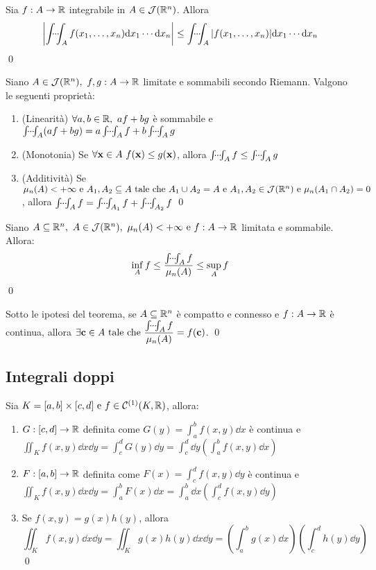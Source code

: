 \begin{theorem}
    Sia $f: A \to \mathbb{R}$ integrabile in $A \in \mathcal{J}(\mathbb{R}^n)$. Allora
    $$
        \abs{\idotsint_A f(x_1,\dots,x_n)\dd x_1\cdots \dd x_n} \leq \idotsint_A\abs{f(x_1,\dots,x_n)}\dd x_1\cdots \dd x_n
    $$
    \qed
\end{theorem}

\begin{theorem}
    Siano $A \in \mathcal{J}(\mathbb{R}^n), \ f,g: A \to \mathbb{R}$ limitate e sommabili secondo Riemann. Valgono le seguenti proprietà:
    \begin{enumerate}
        \item (Linearità) $\forall a,b \in \mathbb{R}, \ af + bg$ è sommabile e $\idotsint_A(af+bg)=a\idotsint_A f+b\idotsint_A g$
        \item (Monotonia) Se $\forall \vb{x} \in A \ f(\vb{x}) \leq g(\vb{x})$, allora $\idotsint_A f \leq \idotsint_A g$
        \item (Additività) Se $\mu_n(A) < + \infty \text{ e } A_1,A_2 \subseteq A \text{ tale che } A_1 \cup A_2 = A \text{ e } A_1,A_2 \in \mathcal{J}(\mathbb{R}^n) \text{ e } \mu_n(A_1 \cap A_2)=0$, allora $\idotsint_A f= \idotsint_{A_1} f+ \idotsint_{A_2} f$
        \qed
    \end{enumerate}
\end{theorem}

\begin{theorem}
    Siano $A \subseteq \mathbb{R}^n, \ A \in \mathcal{J}(\mathbb{R}^n), \ \mu_n(A) < +\infty \text{ e } f: A \to \mathbb{R}$ limitata e sommabile. Allora:
    $$
        \inf_A f \leq \frac{\idotsint_A f}{\mu_n(A)}\leq \sup_A f
    $$
    \qed
\end{theorem}

\begin{corollary}
    Sotto le ipotesi del teorema, se $A \subseteq \mathbb{R}^n$ è compatto e connesso e $f: A \to \mathbb{R}$ è continua, allora $\exists \vb{c} \in A \text{ tale che } \displaystyle\frac{\idotsint_A f}{\mu_n(A)}=f(\vb{c})$.
    \qed
\end{corollary}

\subsection{Integrali doppi}

\begin{theorem}
    Sia $K=[a,b]\times[c,d] \text{ e } f\in \mathcal{C}^{(1)}(K,\mathbb{R})$, allora:
    \begin{enumerate}
        \item $G:[c,d]\to \mathbb{R}$ definita come $G(y)=\int_a^bf(x,y)\dd x$ è continua e $\iint_Kf(x,y)\dd x\dd y=\int_c^dG(y)\dd y=\int_c^d\dd y(\int_a^b f(x,y)\dd x)$
        \item $F:[a,b]\to \mathbb{R}$ definita come $F(x)=\int_c^df(x,y)\dd y$ è continua e $\iint_Kf(x,y)\dd x\dd y=\int_a^bF(x)\dd x=\int_a^b\dd x(\int_c^d f(x,y)\dd y)$
        \item Se $f(x,y)=g(x)h(y)$, allora
        $$
            \iint_Kf(x,y)\dd x\dd y=\iint_Kg(x)h(y)\dd x\dd y=\left(\int_a^bg(x)\dd x\right)\left(\int_c^dh(y)\dd y\right)
        $$
        \qed
    \end{enumerate}
\end{theorem}


